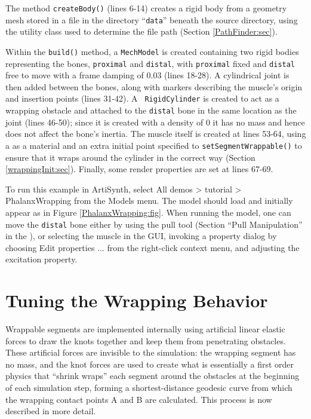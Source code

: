 The method {\tt createBody()} (lines 6-14) creates a rigid body from a
geometry mesh stored in a file in the directory ``{\tt data}'' beneath
the source directory, using the utility class
 used to determine the file path
(Section \ref{PathFinder:sec}).

Within the {\tt build()} method, a {\tt MechModel} is created
containing two rigid bodies representing the bones, {\tt proximal} and
{\tt distal}, with {\tt proximal} fixed and {\tt distal} free to move
with a frame damping of 0.03 (lines 18-28). A cylindrical joint is
then added between the bones, along with markers describing the
muscle's origin and insertion points (lines 31-42).  A {\tt
RigidCylinder} is created to act as a wrapping obstacle and attached
to the {\tt distal} bone in the same location as the joint (lines
46-50); since it is created with a density of 0 it has no mass and
hence does not affect the bone's inertia. The muscle itself is created
at lines 53-64, using a
 as a material
and an extra initial point specified to
{\tt setSegmentWrappable()} to ensure that it wraps around
the cylinder in the correct way (Section
\ref{wrappingInit:sec}). Finally, some render properties are set at lines
67-69.

To run this example in ArtiSynth, select {\sf All demos > tutorial >
PhalanxWrapping} from the {\sf Models} menu. The model should load and
initially appear as in Figure \ref{PhalanxWrapping:fig}.  When running
the model, one can move the {\tt distal} bone either
by using the pull tool (Section ``Pull
Manipulation'' in the
),
or selecting the muscle in the GUI, invoking a property dialog by
choosing {\sf Edit properties ...} from the right-click context menu,
and adjusting the {\sf excitation} property.

\section{Tuning the Wrapping Behavior}
\label{wrapTuning:sec}

Wrappable segments are implemented internally using artificial linear
elastic forces to draw the knots together and keep them from
penetrating obstacles. These artificial forces are invisible to the
simulation: the wrapping segment has no mass, and the knot forces are
used to create what is essentially a first order physics that ``shrink
wraps'' each segment around the obstacles at the beginning of each
simulation step, forming a shortest-distance geodesic curve from
which the wrapping contact points A and B are calculated. This process
is now described in more detail.


